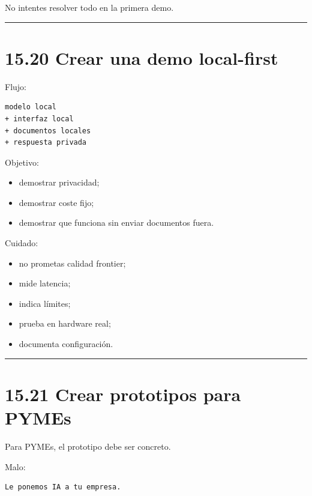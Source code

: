 No intentes resolver todo en la primera demo.

\begin{center}\rule{0.5\linewidth}{0.5pt}\end{center}

\section{15.20 Crear una demo
local-first}\label{crear-una-demo-local-first}

Flujo:

\begin{lstlisting}
modelo local
+ interfaz local
+ documentos locales
+ respuesta privada
\end{lstlisting}

Objetivo:

\begin{itemize}
\tightlist
\item
  demostrar privacidad;
\item
  demostrar coste fijo;
\item
  demostrar que funciona sin enviar documentos fuera.
\end{itemize}

Cuidado:

\begin{itemize}
\tightlist
\item
  no prometas calidad frontier;
\item
  mide latencia;
\item
  indica límites;
\item
  prueba en hardware real;
\item
  documenta configuración.
\end{itemize}

\begin{center}\rule{0.5\linewidth}{0.5pt}\end{center}

\section{15.21 Crear prototipos para
PYMEs}\label{crear-prototipos-para-pymes}

Para PYMEs, el prototipo debe ser concreto.

Malo:

\begin{lstlisting}
Le ponemos IA a tu empresa.
\end{lstlisting}

